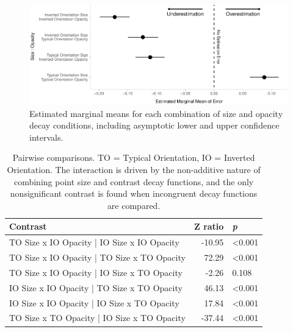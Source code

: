 \documentclass[sigconf]{acmart}
\begin{document}
\begin{figure}

{\centering \includegraphics[width=1\textwidth,height=\textheight]{size_and_opacity_files/figure-pdf/fig-emm-plot-1.pdf}

}

\caption{\label{fig-emm-plot}Estimated marginal means for each
combination of size and opacity decay conditions, including asymptotic
lower and upper confidence intervals.}

\end{figure}

\hypertarget{tbl-contrasts}{}
\begin{table}
\caption{\label{tbl-contrasts}Pairwise comparisons. TO = Typical Orientation, IO = Inverted
Orientation. The interaction is driven by the non-additive nature of
combining point size and contrast decay functions, and the only
nonsignificant contrast is found when incongruent decay functions are
compared. }\tabularnewline

\centering
\begin{tabular}[t]{lrl}
\toprule
Contrast & Z ratio & \textit{p}\\
\midrule
TO Size x IO Opacity | IO Size x IO Opacity & -10.95 & <0.001\\
TO Size x IO Opacity | TO Size x TO Opacity & 72.29 & <0.001\\
TO Size x IO Opacity | IO Size x TO Opacity & -2.26 & 0.108\\
IO Size x IO Opacity | TO Size x TO Opacity & 46.13 & <0.001\\
IO Size x IO Opacity | IO Size x TO Opacity & 17.84 & <0.001\\
TO Size x TO Opacity | IO Size x TO Opacity & -37.44 & <0.001\\
\bottomrule
\end{tabular}
\end{table}
\end{document}
